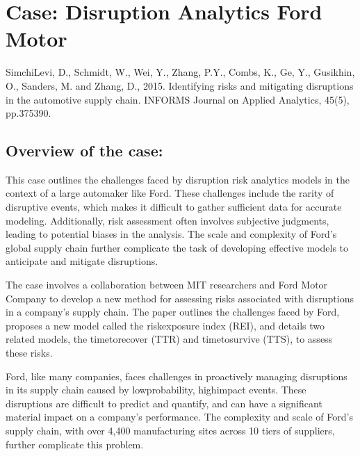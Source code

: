 \documentclass[letterpaper,10pt,english]{jupyterBook}
\begin{document}
\chapter{Case: Disruption Analytics \sphinxhyphen{} Ford Motor}
\label{\detokenize{docs/Case3_disruption_analytics:case-disruption-analytics-ford-motor}}\label{\detokenize{docs/Case3_disruption_analytics::doc}}
\sphinxAtStartPar
{}
Simchi\sphinxhyphen{}Levi, D., Schmidt, W., Wei, Y., Zhang, P.Y., Combs, K., Ge, Y., Gusikhin, O., Sanders, M. and Zhang, D., 2015. Identifying risks and mitigating disruptions in the automotive supply chain. INFORMS Journal on Applied Analytics, 45(5), pp.375\sphinxhyphen{}390.




\section{Overview of the case:}
\label{\detokenize{docs/Case3_disruption_analytics:overview-of-the-case}}
\sphinxAtStartPar
This case outlines the challenges faced by disruption risk analytics models in the context of a large automaker like Ford. These challenges include the rarity of disruptive events, which makes it difficult to gather sufficient data for accurate modeling. Additionally, risk assessment often involves subjective judgments, leading to potential biases in the analysis. The scale and complexity of Ford’s global supply chain further complicate the task of developing effective models to anticipate and mitigate disruptions.

\sphinxAtStartPar
The case involves a collaboration between MIT researchers and Ford Motor Company to develop a new method for assessing risks associated with disruptions in a company’s supply chain. The paper outlines the challenges faced by Ford, proposes a new model called the risk\sphinxhyphen{}exposure index (REI), and details two related models, the time\sphinxhyphen{}to\sphinxhyphen{}recover (TTR) and time\sphinxhyphen{}to\sphinxhyphen{}survive (TTS), to assess these risks.

\sphinxAtStartPar
{}

\sphinxAtStartPar
Ford, like many companies, faces challenges in proactively managing disruptions in its supply chain caused by low\sphinxhyphen{}probability, high\sphinxhyphen{}impact events. These disruptions are difficult to predict and quantify, and can have a significant material impact on a company’s performance. The complexity and scale of Ford’s supply chain, with over 4,400 manufacturing sites across 10 tiers of suppliers, further complicate this problem.
\end{document}
